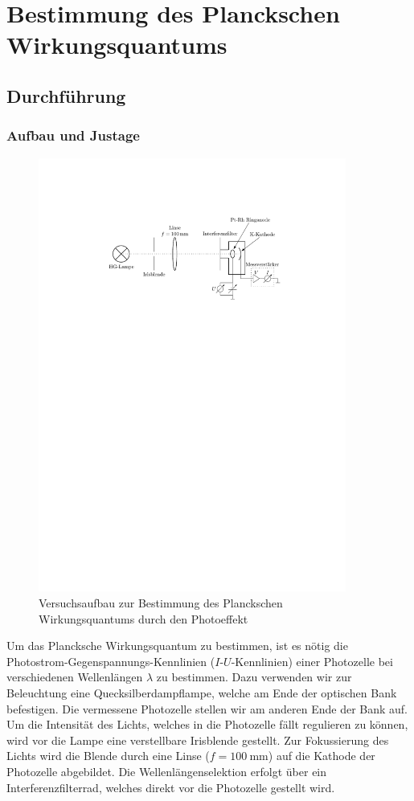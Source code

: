 \documentclass[11pt, a4paper]{article}
\numberwithin{equation}{section}
\begin{document}
\section{Bestimmung des Planckschen Wirkungsquantums}

\subsection{Durchführung}

\subsubsection{Aufbau und Justage}
\begin{figure}[h]
	\centering
	\includegraphics[width=0.9\textwidth]{./figures/versuchsaufbau_photoeffekt.pdf}
	\caption{Versuchsaufbau zur Bestimmung des Planckschen Wirkungsquantums durch den Photoeffekt}
	\label{fig:aufbau_photoeffekt}
\end{figure}
Um das Plancksche Wirkungsquantum zu bestimmen, ist es nötig die Photostrom-Gegenspannungs-Kennlinien ($I$-$U$-Kennlinien) einer Photozelle bei verschiedenen Wellenlängen $\lambda$ zu bestimmen.
Dazu verwenden wir zur Beleuchtung eine Quecksilberdampflampe, welche am Ende der optischen Bank befestigen.
Die vermessene Photozelle stellen wir am anderen Ende der Bank auf.
Um die Intensität des Lichts, welches in die Photozelle fällt regulieren zu können, wird vor die Lampe eine verstellbare Irisblende gestellt.
Zur Fokussierung des Lichts wird die Blende durch eine Linse ($f=\SI{100}{\milli\metre}$) auf die Kathode der Photozelle abgebildet.
Die Wellenlängenselektion erfolgt über ein Interferenzfilterrad, welches direkt vor die Photozelle gestellt wird.
\end{document}
